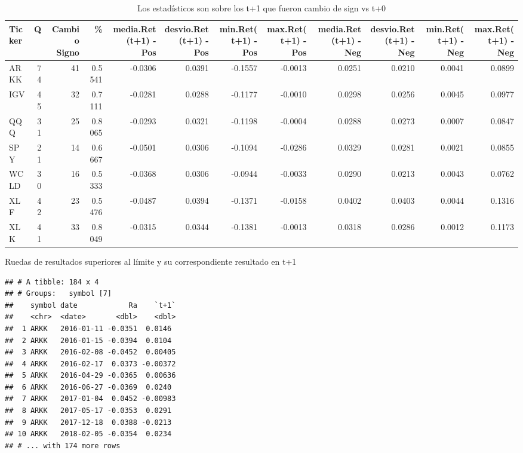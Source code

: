 \documentclass[
]{article}
\begin{document}
\begin{table}

\caption{\label{tab:function2}Los estadísticos son sobre los t+1 que fueron cambio de sign vs t+0}
\centering
\begin{tabular}[t]{l|r|r|r|r|r|r|r|r|r|r|r}
\hline
Ticker & Q & Cambio Signo & \% & media.Ret (t+1) - Pos & desvio.Ret(t+1) - Pos & min.Ret(t+1) - Pos & max.Ret(t+1) - Pos & media.Ret (t+1) - Neg & desvio.Ret(t+1) - Neg & min.Ret(t+1) - Neg & max.Ret(t+1) - Neg\\
\hline
ARKK & 74 & 41 & 0.5541 & -0.0306 & 0.0391 & -0.1557 & -0.0013 & 0.0251 & 0.0210 & 0.0041 & 0.0899\\
\hline
IGV & 45 & 32 & 0.7111 & -0.0281 & 0.0288 & -0.1177 & -0.0010 & 0.0298 & 0.0256 & 0.0045 & 0.0977\\
\hline
QQQ & 31 & 25 & 0.8065 & -0.0293 & 0.0321 & -0.1198 & -0.0004 & 0.0288 & 0.0273 & 0.0007 & 0.0847\\
\hline
SPY & 21 & 14 & 0.6667 & -0.0501 & 0.0306 & -0.1094 & -0.0286 & 0.0329 & 0.0281 & 0.0021 & 0.0855\\
\hline
WCLD & 30 & 16 & 0.5333 & -0.0368 & 0.0306 & -0.0944 & -0.0033 & 0.0290 & 0.0213 & 0.0043 & 0.0762\\
\hline
XLF & 42 & 23 & 0.5476 & -0.0487 & 0.0394 & -0.1371 & -0.0158 & 0.0402 & 0.0403 & 0.0044 & 0.1316\\
\hline
XLK & 41 & 33 & 0.8049 & -0.0315 & 0.0344 & -0.1381 & -0.0013 & 0.0318 & 0.0286 & 0.0012 & 0.1173\\
\hline
\end{tabular}
\end{table}

Ruedas de resultados superiores al límite y su correspondiente resultado
en t+1

\begin{verbatim}
## # A tibble: 184 x 4
## # Groups:   symbol [7]
##    symbol date            Ra    `t+1`
##    <chr>  <date>       <dbl>    <dbl>
##  1 ARKK   2016-01-11 -0.0351  0.0146 
##  2 ARKK   2016-01-15 -0.0394  0.0104 
##  3 ARKK   2016-02-08 -0.0452  0.00405
##  4 ARKK   2016-02-17  0.0373 -0.00372
##  5 ARKK   2016-04-29 -0.0365  0.00636
##  6 ARKK   2016-06-27 -0.0369  0.0240 
##  7 ARKK   2017-01-04  0.0452 -0.00983
##  8 ARKK   2017-05-17 -0.0353  0.0291 
##  9 ARKK   2017-12-18  0.0388 -0.0213 
## 10 ARKK   2018-02-05 -0.0354  0.0234 
## # ... with 174 more rows
\end{verbatim}
\end{document}
